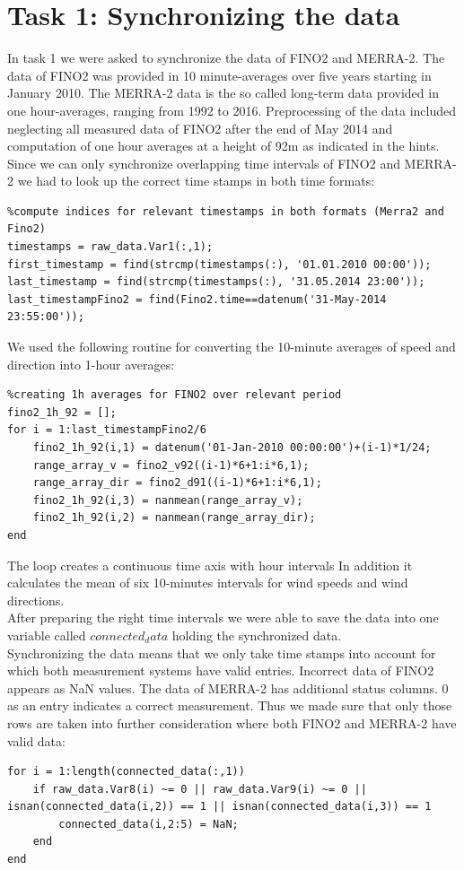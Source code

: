 \documentclass[10pt]{article}
\begin{document}
\section{Task 1: Synchronizing the data}
In task 1 we were asked to synchronize the data of FINO2 and MERRA-2. The data of FINO2 was provided in 10 minute-averages over five years starting in January 2010. The MERRA-2 data is the so called long-term data provided in one hour-averages, ranging from 1992 to 2016.
Preprocessing of the data included neglecting all measured data of FINO2 after the end of May 2014 and computation of one hour averages at a height of 92m as indicated in the hints.
Since we can only synchronize overlapping time intervals of FINO2 and MERRA-2 we had to look up the correct time stamps in both time formats: 
\begin{lstlisting}
%compute indices for relevant timestamps in both formats (Merra2 and Fino2)
timestamps = raw_data.Var1(:,1);
first_timestamp = find(strcmp(timestamps(:), '01.01.2010 00:00'));
last_timestamp = find(strcmp(timestamps(:), '31.05.2014 23:00'));
last_timestampFino2 = find(Fino2.time==datenum('31-May-2014 23:55:00'));
\end{lstlisting}
We used the following routine for converting the 10-minute averages of speed and direction into 1-hour averages:
\begin{lstlisting}
%creating 1h averages for FINO2 over relevant period
fino2_1h_92 = [];
for i = 1:last_timestampFino2/6
    fino2_1h_92(i,1) = datenum('01-Jan-2010 00:00:00')+(i-1)*1/24;
    range_array_v = fino2_v92((i-1)*6+1:i*6,1);
    range_array_dir = fino2_d91((i-1)*6+1:i*6,1);
    fino2_1h_92(i,3) = nanmean(range_array_v);
    fino2_1h_92(i,2) = nanmean(range_array_dir);
end
\end{lstlisting}
The loop creates a continuous time axis with hour intervals  In addition it calculates the mean of six 10-minutes intervals for wind speeds and wind directions.\\

After preparing the right time intervals we were able to save the data into one variable called $connected_data$ holding the synchronized data. \\
Synchronizing the data means that we only take time stamps into account for which both measurement systems have valid entries. Incorrect data of FINO2 appears as NaN values. The data of MERRA-2 has additional status columns. $0$ as an entry indicates a correct measurement. Thus we made sure that only those rows are taken into further consideration where both FINO2 and MERRA-2 have valid data:
\begin{lstlisting}
for i = 1:length(connected_data(:,1))
    if raw_data.Var8(i) ~= 0 || raw_data.Var9(i) ~= 0 || isnan(connected_data(i,2)) == 1 || isnan(connected_data(i,3)) == 1
        connected_data(i,2:5) = NaN;
    end
end
\end{lstlisting}
\end{document}

